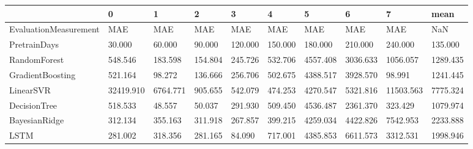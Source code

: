 \begin{tabular}{llllllllll}
\toprule
{} &         0 &        1 &       2 &       3 &       4 &        5 &        6 &         7 &     mean \\
\midrule
EvaluationMeasurement &       MAE &      MAE &     MAE &     MAE &     MAE &      MAE &      MAE &       MAE &      NaN \\
PretrainDays          &    30.000 &   60.000 &  90.000 & 120.000 & 150.000 &  180.000 &  210.000 &   240.000 &  135.000 \\
RandomForest          &   548.546 &  183.598 & 154.804 & 245.726 & 532.706 & 4557.408 & 3036.633 &  1056.057 & 1289.435 \\
GradientBoosting      &   521.164 &   98.272 & 136.666 & 256.706 & 502.675 & 4388.517 & 3928.570 &    98.991 & 1241.445 \\
LinearSVR             & 32419.910 & 6764.771 & 905.655 & 542.079 & 474.253 & 4270.547 & 5321.816 & 11503.563 & 7775.324 \\
DecisionTree          &   518.533 &   48.557 &  50.037 & 291.930 & 509.450 & 4536.487 & 2361.370 &   323.429 & 1079.974 \\
BayesianRidge         &   312.134 &  355.163 & 311.918 & 267.857 & 399.215 & 4259.034 & 4422.826 &  7542.953 & 2233.888 \\
LSTM                  &   281.002 &  318.356 & 281.165 &  84.090 & 717.001 & 4385.853 & 6611.573 &  3312.531 & 1998.946 \\
\bottomrule
\end{tabular}
